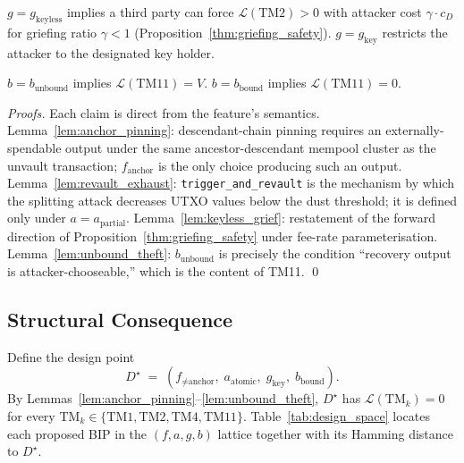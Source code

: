 \begin{lemma}\label{lem:keyless_grief}
$g = g_{\text{keyless}}$ implies a third party can force
$\mathcal{L}(\mathrm{TM2}) > 0$ with attacker cost
$\gamma \cdot c_D$ for griefing ratio $\gamma < 1$
(Proposition~\ref{thm:griefing_safety}). $g = g_{\text{key}}$ restricts
the attacker to the designated key holder.
\end{lemma}

\begin{lemma}\label{lem:unbound_theft}
$b = b_{\text{unbound}}$ implies $\mathcal{L}(\mathrm{TM11}) = V$.
$b = b_{\text{bound}}$ implies $\mathcal{L}(\mathrm{TM11}) = 0$.
\end{lemma}

\begin{proof}[Proofs]
Each claim is direct from the feature's semantics.
Lemma~\ref{lem:anchor_pinning}: descendant-chain pinning requires an
externally-spendable output under the same ancestor-descendant mempool
cluster as the unvault transaction; $f_{\text{anchor}}$ is the only
choice producing such an output. Lemma~\ref{lem:revault_exhaust}:
\texttt{trigger\_and\_revault} is the mechanism by which the splitting
attack decreases UTXO values below the dust threshold; it is defined
only under $a = a_{\text{partial}}$. Lemma~\ref{lem:keyless_grief}:
restatement of the forward direction of
Proposition~\ref{thm:griefing_safety} under fee-rate parameterisation.
Lemma~\ref{lem:unbound_theft}: $b_{\text{unbound}}$ is precisely the
condition ``recovery output is attacker-chooseable,'' which is the
content of TM11. \qed
\end{proof}

\subsection{Structural Consequence}
\label{ss:struct_consequence}

Define the design point
\[
  D^\star \;=\; (f_{\neq\text{anchor}},\;
    a_{\text{atomic}},\; g_{\text{key}},\; b_{\text{bound}}).
\]
By Lemmas~\ref{lem:anchor_pinning}--\ref{lem:unbound_theft}, $D^\star$
has $\mathcal{L}(\mathrm{TM}_k) = 0$ for every
$\mathrm{TM}_k \in \{\mathrm{TM1}, \mathrm{TM2}, \mathrm{TM4},
\mathrm{TM11}\}$. Table~\ref{tab:design_space} locates each proposed
BIP in the $(f, a, g, b)$ lattice together with its Hamming distance
to $D^\star$.

